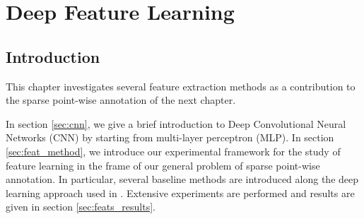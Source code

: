\chapter{Deep Feature Learning}

\section{Introduction}

This chapter investigates several feature extraction methods as a contribution to the sparse point-wise annotation of the next chapter.

In section \ref{sec:cnn}, we give a brief introduction to Deep Convolutional Neural Networks (CNN) by starting from multi-layer perceptron (MLP).
In section \ref{sec:feat_method}, we introduce our experimental framework for the study of feature learning in the frame of our general problem of sparse point-wise annotation.
In particular, several baseline methods are introduced along the deep learning approach used in \cite{lejeune18}.
Extensive experiments are performed and results are given in section \ref{sec:feats_results}.

\endinput

